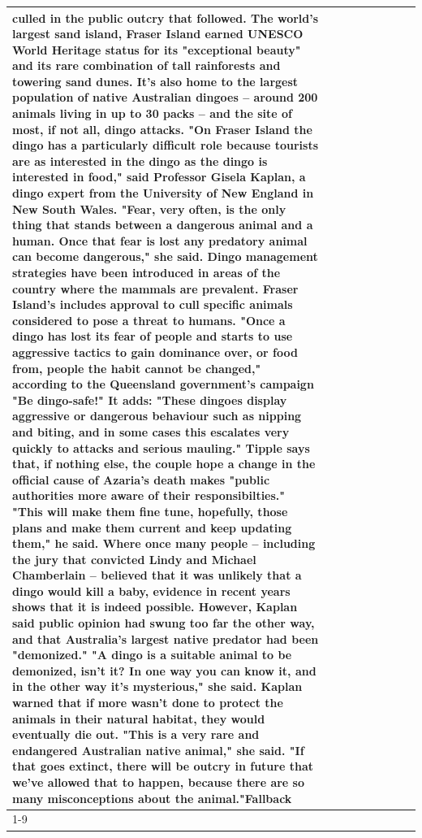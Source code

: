 \begin{table}[H]
\begin{tabular}{lllrlllll}
culled in the public outcry that followed. The world's largest sand island, Fraser Island earned UNESCO World Heritage status for its "exceptional beauty" and its rare combination of tall rainforests and towering sand dunes. It's also home to the largest population of native Australian dingoes -- around 200 animals living in up to 30 packs -- and the site of most, if not all, dingo attacks. "On Fraser Island the dingo has a particularly difficult role because tourists are as interested in the dingo as the dingo is interested in food," said Professor Gisela Kaplan, a dingo expert from the University of New England in New South Wales. "Fear, very often, is the only thing that stands between a dangerous animal and a human. Once that fear is lost any predatory animal can become dangerous," she said. Dingo management strategies have been introduced in areas of the country where the mammals are prevalent. Fraser Island's includes approval to cull specific animals considered to pose a threat to humans. "Once a dingo has lost its fear of people and starts to use aggressive tactics to gain dominance over, or food from, people the habit cannot be changed," according to the Queensland government's campaign "Be dingo-safe!" It adds: "These dingoes display aggressive or dangerous behaviour such as nipping and biting, and in some cases this escalates very quickly to attacks and serious mauling." Tipple says that, if nothing else, the couple hope a change in the official cause of Azaria's death makes "public authorities more aware of their responsibilties." "This will make them fine tune, hopefully, those plans and make them current and keep updating them," he said. Where once many people -- including the jury that convicted Lindy and Michael Chamberlain -- believed that it was unlikely that a dingo would kill a baby, evidence in recent years shows that it is indeed possible. However, Kaplan said public opinion had swung too far the other way, and that Australia's largest native predator had been "demonized." "A dingo is a suitable animal to be demonized, isn't it? In one way you can know it, and in the other way it's mysterious," she said. Kaplan warned that if more wasn't done to protect the animals in their natural habitat, they would eventually die out. "This is a very rare and endangered Australian native animal," she said. "If that goes extinct, there will be outcry in future that we've allowed that to happen, because there are so many misconceptions about the animal."Fallback \\
\cline{1-9}

\end{tabular}
\end{table}

